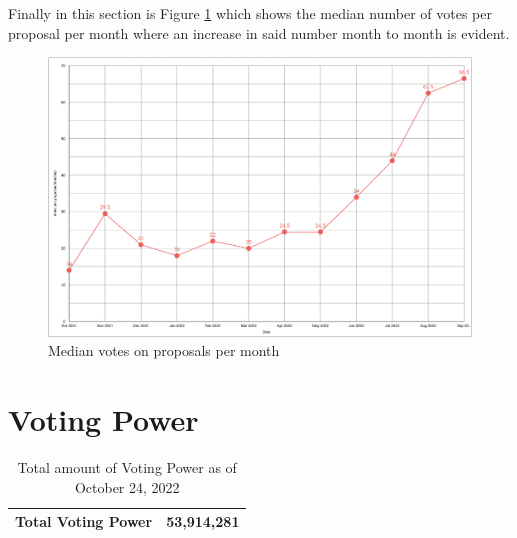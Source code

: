 \documentclass[MSE,Master,english]{twbook}%
\begin{document}
Finally in this section is Figure \ref{fig:median_votes} which shows the median number of votes per proposal per month where an increase in said number month to month is evident.
\begin{figure}[H]
  \centering
  \includegraphics[width=\textwidth]{metrics/median_votes.png}
  \caption{Median votes on proposals per month}
  \label{fig:median_votes}
\end{figure}


\section{Voting Power}
\begin{center}
  \begin{table}[H]
    \begin{tabular}{ | m{20em} | m{20em} | }
      \hline
      \textbf{Total Voting Power} & 53,914,281 \\
      \hline
    \end{tabular}
    \caption{Total amount of Voting Power as of October 24, 2022}
    \label{table:VP}
  \end{table}
\end{center}
\end{document}
